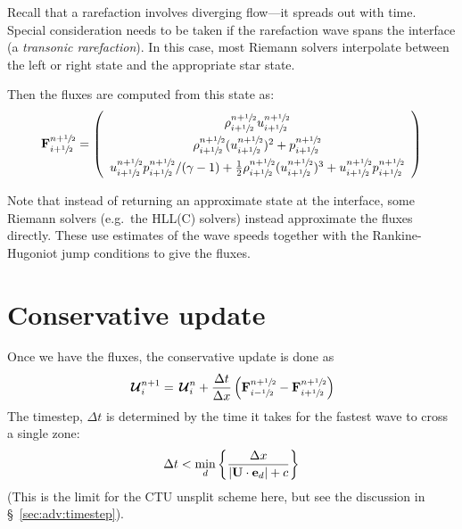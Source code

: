 Recall that a rarefaction involves diverging flow---it spreads out
with time.  Special consideration needs to be taken if the rarefaction
wave spans the interface (a {\em transonic rarefaction}).  In this
case, most Riemann solvers interpolate between the left or right state
and the appropriate star state.

Then the fluxes are computed from this state as:
\begin{equation}
\renewcommand{\arraystretch}{1.5}
\Fb_{i+\myhalf}^{n+\myhalf} = \left ( \begin{array}{c}
                             \rho_{i+\myhalf}^{n+\myhalf} u_{i+\myhalf}^{n+\myhalf} \\
                             \rho_{i+\myhalf}^{n+\myhalf} (u_{i+\myhalf}^{n+\myhalf})^2 + p_{i+\myhalf}^{n+\myhalf} \\
                             u_{i+\myhalf}^{n+\myhalf} p_{i+\myhalf}^{n+\myhalf} / (\gamma - 1)  +
                             \frac{1}{2} \rho_{i+\myhalf}^{n+\myhalf} (u_{i+\myhalf}^{n+\myhalf})^3 +
                             u_{i+\myhalf}^{n+\myhalf} p_{i+\myhalf}^{n+\myhalf}
                            \end{array} \right )
\renewcommand{\arraystretch}{1.0}
\end{equation}

Note that instead of returning an approximate state at the interface,
some Riemann solvers (e.g.\ the HLL(C) solvers) instead approximate
the fluxes directly.  These use estimates of the wave speeds together
with the Rankine-Hugoniot jump conditions to give the fluxes.


\section{Conservative update}

Once we have the fluxes, the conservative update is done as
\begin{equation}
{\,\boldsymbol{\mathcal{U}}}^{n+1}_i = {\,\boldsymbol{\mathcal{U}}}^n_i + \frac{\Delta t}{\Delta x} 
   \left ( {\bf F}_{i-{\sfrac{1}{2}}}^{n+{\sfrac{1}{2}}} - {\bf F}_{i+{\sfrac{1}{2}}}^{n+{\sfrac{1}{2}}} \right )
\end{equation}
The timestep, $\Delta t$ is determined by the time it takes for the
fastest wave to cross a single zone:
\begin{equation}
\Delta t < \min_d \left \{ \frac{\Delta x}{|{\bf U} \cdot {\bf e}_d| + c}\right \}
\end{equation}
(This is the limit for the CTU unsplit scheme here, but see the discussion
in \S~\ref{sec:adv:timestep}).

